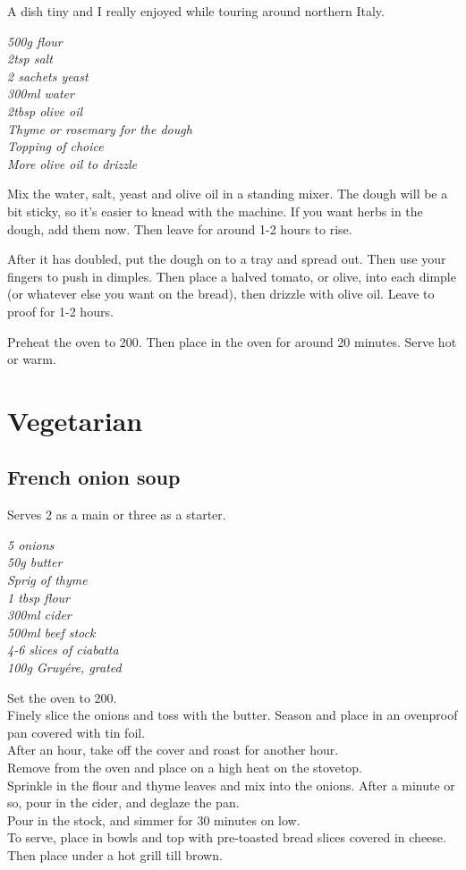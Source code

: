 \documentclass{tufte-book}
\begin{document}
A dish tiny and I really enjoyed while touring around northern Italy. 

\smallskip
\emph{500g flour
\\2tsp salt
\\2 sachets yeast
\\300ml water
\\2tbsp olive oil
\\Thyme or rosemary for the dough
\\Topping of choice
\\More olive oil to drizzle}

\smallskip
Mix the water, salt, yeast and olive oil in a standing mixer. The dough will be a bit sticky, so it's easier to knead with the machine. If you want herbs in the dough, add them now. Then leave for around 1-2 hours to rise. 

After it has doubled, put the dough on to a tray and spread out. Then use your fingers to push in dimples. Then place a halved tomato, or olive, into each dimple (or whatever else you want on the bread), then drizzle with olive oil. Leave to proof for 1-2 hours.

Preheat the oven to 200\celsius. Then place in the oven for around 20 minutes. Serve hot or warm.

\chapter{Vegetarian}

\section{French onion soup}

Serves 2 as a main or three as a starter.

\emph{5 onions
\\50g butter
\\Sprig of thyme
\\1 tbsp flour
\\300ml cider
\\500ml beef stock
\\4-6 slices of ciabatta
\\100g Gruy\'ere, grated
}

\smallskip
Set the oven to 200\celsius.
\\Finely slice the onions and toss with the butter. Season and place in an ovenproof pan covered with tin foil.
\\After an hour, take off the cover and roast for another hour.
\\Remove from the oven and place on a high heat on the stovetop. 
\\Sprinkle in the flour and thyme leaves and mix into the onions. After a minute or so, pour in the cider, and deglaze the pan.
\\Pour in the stock, and simmer for 30 minutes on low.
\\To serve, place in bowls and top with pre-toasted bread slices covered in cheese. Then place under a hot grill till brown.
\end{document}
